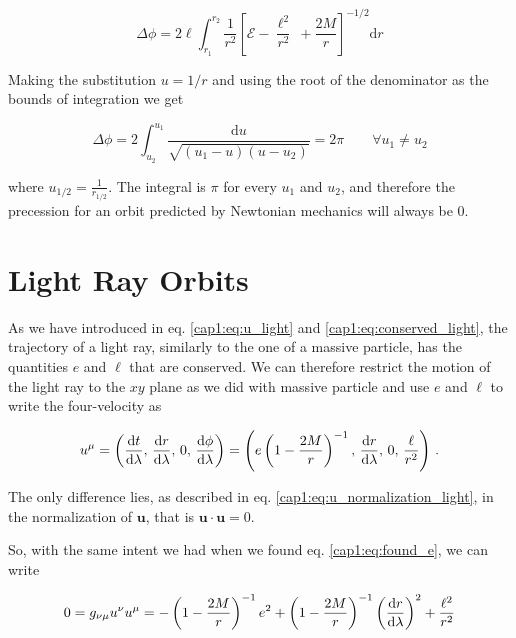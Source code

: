 \begin{equation*}
    \Delta \phi = 2 \ell \int_{r_1}^{r_2} \frac{1}{r^2} \left[\mathcal E -
    \frac{\ell^2}{r^2}\ + \frac{2M}{r} \right]^{-1/2} \mathrm{d}r
\end{equation*}

Making the substitution $u = 1 / r$ and using the root of the denominator as
the bounds of integration we get

\begin{equation}
    \Delta \phi
    = 2 \int_{u_2}^{u_1} \frac{\mathrm{d} u}{\sqrt{(u_1 - u)(u - u_2)}} 
    = 2 \pi \quad \quad \forall u_1 \neq u_2
\end{equation}

where $u_{1/2} = \frac{1}{r_{1/2}}$.
The integral is $\pi$ for every $u_1$ and $u_2$, and therefore the precession
for an orbit predicted by Newtonian mechanics will always be $0$.


\newpage


\section{Light Ray Orbits}

As we have introduced in eq. \ref{cap1:eq:u_light} and
\ref{cap1:eq:conserved_light}, the trajectory of a light ray, similarly to the
one of a massive particle, has the quantities $e$ and $\ell$ that are conserved.
We can therefore restrict the motion of the light ray to the $xy$ plane as we
did with massive particle and use $e$ and $\ell$ to write the four-velocity as

\begin{equation*}
    u^\mu
    = \left(\dv{t}{\lambda}, \, \dv{r}{\lambda}, \,
    0, \, \dv{\phi}{\lambda} \right)
    = \left( e \left(1 - \frac{2M}{r} \right)^{-1}, \, \dv{r}{\lambda}, \,
    0, \, \frac{\ell}{r^2} \right) \, .
\end{equation*}

The only difference lies, as described in eq.
\ref{cap1:eq:u_normalization_light}, in the normalization of $\mathbf u$, that
is $\mathbf{u \cdot u} = 0$.

So, with the same intent we had when we found eq. \ref{cap1:eq:found_e}, we can
write

\begin{equation*}
    0 = g_{\nu \mu} u^\nu u^\mu =
    - \left(1 - \frac{2M}{r} \right)^{-1} e^2
    + \left(1 - \frac{2M}{r} \right)^{- 1} \left(\dv{r}{\lambda} \right)^2
    + \frac{\ell^2}{r^2}
\end{equation*}

